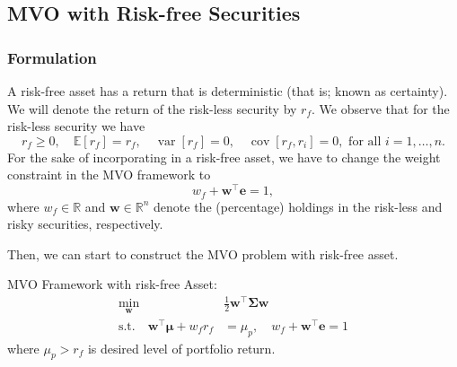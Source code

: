 \documentclass[13pt]{article}
\theoremstyle{definition}
\theoremstyle{remark}
\begin{document}
\subsection{MVO with Risk-free Securities}
\subsubsection{Formulation}
A risk-free asset has a return that is deterministic (that is; known as certainty). We will denote the return of the risk-less security by $r_{f}$. We observe that for the risk-less security we have
$$
r_{f}\ge 0,\quad \mathbb{E}\left[r_{f}\right] =r_{f}, \quad
\operatorname{var}\left[r_{f}\right]  =0, \quad 
\operatorname{cov}\left[r_{f}, r_{i}\right]  =0, \text { for all } i=1, \ldots, n.
$$
For the sake of incorporating in a risk-free asset, we have to change the weight constraint in the MVO framework to 
$$
w_f+\bm{w}^{\top} \bm{e}=1,
$$
where $w_f \in \mathbb{R}$ and $\bm{w} \in \mathbb{R}^n$ denote the (percentage) holdings in the risk-less and risky securities, respectively.

Then, we can start to construct the MVO problem with risk-free asset.

{\color{C6} MVO Framework with risk-free Asset:}
\begin{align*}
    \min _{\bm{w}} \quad & \frac{1}{2} \bm{w}^{\top} \mathbf{\Sigma} \bm{w} \\
    \text {s.t.} \quad   \bm{w}^{\top}\bm{\mu}+w_f r_{f} &=\mu_p, \quad  
 w_f+\bm{w}^{\top} \bm{e}=1
\end{align*}
where $\mu_p>r_{f}$ is desired level of portfolio return.
\end{document}
